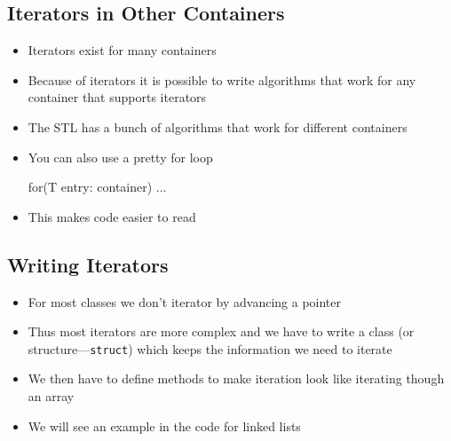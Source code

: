 
\begin{slide}
\section{Iterators in Other Containers}

\begin{PauseHighLight}
  \begin{itemize}
  \item Iterators exist for many containers
  \item Because of iterators it is possible to write algorithms that
    work for any container that supports iterators
  \item The STL has a bunch of algorithms that work for different
    containers
  \item You can also use a pretty for loop
    \begin{cpp}
      for(T entry: container) {
        ...
      }
    \end{cpp}
  \item This makes code easier to read
  \end{itemize}
\end{PauseHighLight}

\end{slide}


\begin{slide}
\section{Writing Iterators}

\begin{PauseHighLight}
  \begin{itemize}
  \item For most classes we don't iterator by advancing a pointer
  \item Thus most iterators are more complex and we have to write a
    class (or structure---\texttt{struct}) which keeps the information
    we need to iterate 
  \item We then have to define methods to make iteration look like
    iterating though an array
  \item We will see an example in the code for linked lists
  \end{itemize}
\end{PauseHighLight}

\end{slide}
